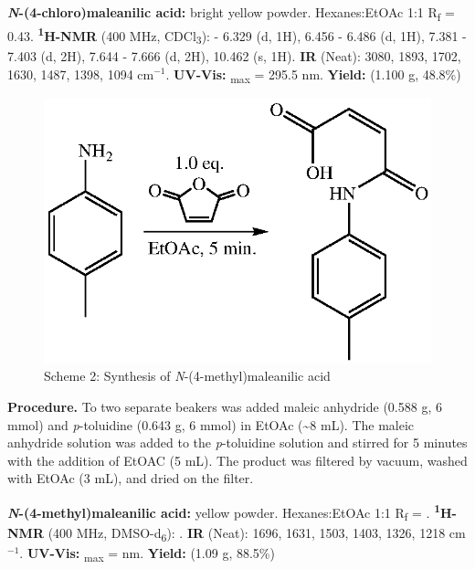\documentclass[11pt]{article}
\let\bf\textbf
\begin{document}
\bf{\textit{N}-(4-chloro)maleanilic acid:} bright yellow powder. Hexanes:EtOAc 1:1 R\textsubscript{f} = 0.43. \bf{\textsuperscript{1}H-NMR} (400 MHz, CDCl\textsubscript{3}): \textdelta{} - 6.329 (d, 1H), 6.456 - 6.486 (d, 1H), 7.381 - 7.403 (d, 2H), 7.644 - 7.666 (d, 2H), 10.462 (s, 1H). \bf{IR} (Neat): 3080, 1893, 1702, 1630, 1487, 1398, 1094 cm$^{-1}$. \bf{UV-Vis:} \textlambda\textsubscript{max} = 295.5 nm. \bf{Yield:} (1.100 g, 48.8\%)

\begin{figure}[H]
    \centering
    \includegraphics[scale=0.8]{schemes/scheme1.2.eps}
    \caption*{Scheme 2: Synthesis of \textit{N}-(4-methyl)maleanilic acid}
\end{figure}

\bf{Procedure.} To two separate beakers was added maleic anhydride (0.588 g, 6 mmol) and \textit{p}-toluidine (0.643 g, 6 mmol) in EtOAc (\textasciitilde 8 mL). The maleic anhydride solution was added to the \textit{p}-toluidine solution and stirred for 5 minutes with the addition of EtOAC (5 mL). The product was filtered by vacuum, washed with EtOAc (3 mL), and dried on the filter.

\bf{\textit{N}-(4-methyl)maleanilic acid:} yellow powder. Hexanes:EtOAc 1:1 R\textsubscript{f} = . \bf{\textsuperscript{1}H-NMR} (400 MHz, DMSO-d\textsubscript{6}): \textdelta\; . \bf{IR} (Neat): 1696, 1631, 1503, 1403, 1326, 1218 cm$^{-1}$. \bf{UV-Vis:} \textlambda\textsubscript{max} = nm. \bf{Yield:} (1.09 g, 88.5\%)
\end{document}
